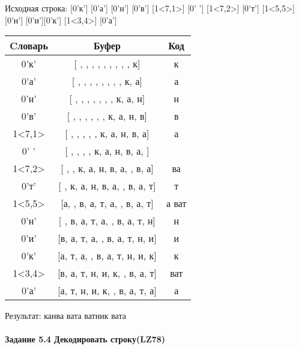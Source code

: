 \documentclass[a4paper, 12pt]{article}
\begin{document}
Исходная строка: [0'к'] [0'а'] [0'н'] [0'в'] [1<7,1>] [0' '] [1<7,2>] [0'т'] [1<5,5>] [0'н'] [0'и'][0'к'] [1<3,4>] [0'а']\\
\begin{table}[h!]
\centering
\begin{tabular}{|c|c|c|}
\hline
 Cловарь & Буфер & Код  \\ \hline
0'к' & [ ,  ,  ,  ,  ,  ,  ,  ,  , к] & к
\\ \hline
0'а' & [ ,  ,  ,  ,  ,  ,  ,  , к, а] & а
\\ \hline
0'н' & [ ,  ,  ,  ,  ,  ,  , к, а, н] & н
\\ \hline
0'в' & [ ,  ,  ,  ,  ,  , к, а, н, в] & в
\\ \hline
1<7,1> & [ ,  ,  ,  ,  , к, а, н, в, а] & а
\\ \hline
0' ' & [ ,  ,  ,  , к, а, н, в, а,  ] &  
\\ \hline
1<7,2> & [ ,  , к, а, н, в, а,  , в, а] & ва
\\ \hline
0'т' & [ , к, а, н, в, а,  , в, а, т] & т
\\ \hline
1<5,5> & [а,  , в, а, т, а,  , в, а, т] & а ват
\\ \hline
0'н' & [ , в, а, т, а,  , в, а, т, н] & н
\\ \hline
0'и' & [в, а, т, а,  , в, а, т, н, и] & и
\\ \hline
0'к' & [а, т, а,  , в, а, т, н, и, к] & к
\\ \hline
1<3,4> & [в, а, т, н, и, к,  , в, а, т] &  ват
\\ \hline
0'а' & [а, т, н, и, к,  , в, а, т, а] & а
\\ \hline
\end{tabular}
\end{table}

Результат: канва вата ватник вата
\pagebreak
\paragraph{Задание 5.4 Декодировать строку(LZ78)\\}
\end{document}
